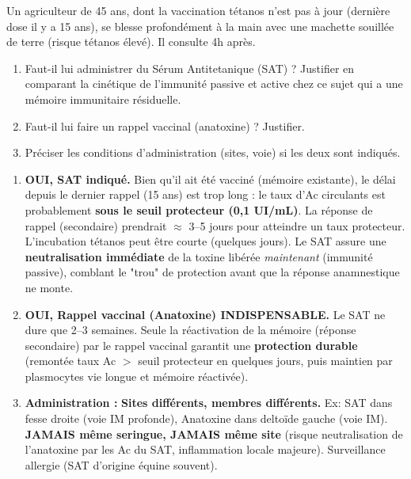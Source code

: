 \documentclass[11pt]{article}
\begin{document}
\begin{exercice}
Un agriculteur de 45 ans, dont la vaccination tétanos n'est pas à jour (dernière dose il y a 15 ans), se blesse profondément à la main avec une machette souillée de terre (risque tétanos élevé). Il consulte 4h après.
\begin{enumerate}
    \item Faut-il lui administrer du Sérum Antitetanique (SAT) ? Justifier en comparant la cinétique de l'immunité passive et active chez ce sujet qui a une mémoire immunitaire résiduelle.
    \item Faut-il lui faire un rappel vaccinal (anatoxine) ? Justifier.
    \item Préciser les conditions d'administration (sites, voie) si les deux sont indiqués.
\end{enumerate}
\end{exercice}

\begin{corrige}
\begin{enumerate}
    \item \textbf{OUI, SAT indiqué.} Bien qu'il ait été vacciné (mémoire existante), le délai depuis le dernier rappel (15 ans) est trop long : le taux d'Ac circulants est probablement \textbf{sous le seuil protecteur (0,1 UI/mL)}. La réponse de rappel (secondaire) prendrait $\approx$ 3--5 jours pour atteindre un taux protecteur. L'incubation tétanos peut être courte (quelques jours). Le SAT assure une \textbf{neutralisation immédiate} de la toxine libérée \emph{maintenant} (immunité passive), comblant le "trou" de protection avant que la réponse anamnestique ne monte.
    \item \textbf{OUI, Rappel vaccinal (Anatoxine) INDISPENSABLE.} Le SAT ne dure que 2--3 semaines. Seule la réactivation de la mémoire (réponse secondaire) par le rappel vaccinal garantit une \textbf{protection durable} (remontée taux Ac $>$ seuil protecteur en quelques jours, puis maintien par plasmocytes vie longue et mémoire réactivée).
    \item \textbf{Administration :} \textbf{Sites différents, membres différents.} Ex: SAT dans fesse droite (voie IM profonde), Anatoxine dans deltoïde gauche (voie IM). \textbf{JAMAIS même seringue, JAMAIS même site} (risque neutralisation de l'anatoxine par les Ac du SAT, inflammation locale majeure). Surveillance allergie (SAT d'origine équine souvent).
\end{enumerate}
\end{corrige}
\end{document}
